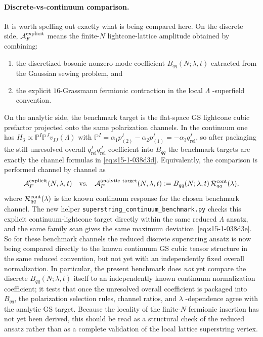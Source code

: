 \documentclass[11pt]{article}
\numberwithin{equation}{section}
\begin{document}
\paragraph{Discrete-vs-continuum comparison.}
It is worth spelling out exactly what is being compared here. On the discrete
side,
\(
{\cal A}_F^{\rm explicit}
\)
means the finite-$N$ lightcone-lattice amplitude obtained by combining:
\begin{enumerate}
\item the discretized bosonic nonzero-mode coefficient
\(
B_{qq}(N;\lambda,t)
\)
extracted from the Gaussian sewing problem, and
\item the explicit $16$-Grassmann fermionic contraction in the local
\(
\Lambda
\)
-superfield convention.
\end{enumerate}
On the analytic side, the benchmark target is the flat-space GS lightcone cubic
prefactor projected onto the same polarization channels. In the continuum one has
\(
H_3\propto \mathbb{P}^I\mathbb{P}^J v_{IJ}(\Lambda)
\)
with
\(
\mathbb{P}^I=\alpha_1 p_{(2)}^I-\alpha_2 p_{(1)}^I=-\alpha_3 q_{\mathrm{rel}}^I
\),
so after packaging the still-unresolved overall
$q_{\mathrm{rel}}^Iq_{\mathrm{rel}}^J$ coefficient into
$B_{qq}$ the benchmark targets are exactly the channel formulas in
\eqref{eq:s15-1-038d3d}. Equivalently, the comparison is performed channel by
channel as
\begin{equation}
\label{eq:s15-1-038d3f}
{\cal A}_F^{\rm explicit}(N,\lambda,t)
\quad\text{vs.}\quad
{\cal A}_F^{\rm analytic\ target}(N,\lambda,t)
:=
B_{qq}(N;\lambda,t)\,{\cal R}^{\rm cont}_{qq}(\lambda),
\end{equation}
where
\(
{\cal R}^{\rm cont}_{qq}(\lambda)
\)
is the known continuum response for the chosen benchmark channel. The new helper
\texttt{superstring\_continuum\_benchmark.py} checks this explicit
continuum-lightcone target directly within the same reduced $\Lambda$ ansatz, and the same family scan gives the same
maximum deviation~\eqref{eq:s15-1-038d3e}. So for these benchmark channels the
reduced discrete superstring ansatz is now being compared directly to the known continuum GS cubic
tensor structure in the same reduced convention, but not yet with an
independently fixed overall normalization. In particular, the present benchmark
does \emph{not} yet compare the discrete
\(
B_{qq}(N;\lambda,t)
\)
itself to an independently known continuum normalization coefficient; it tests
that once the unresolved overall coefficient is packaged into
\(
B_{qq}
\),
the polarization selection rules, channel ratios, and
\(
\lambda
\)
-dependence agree with the analytic GS target. Because the locality of the finite-$N$ fermionic insertion has not yet been derived, this should be read as a structural check of the reduced ansatz rather than as a complete validation of the local lattice superstring vertex.
\end{document}
